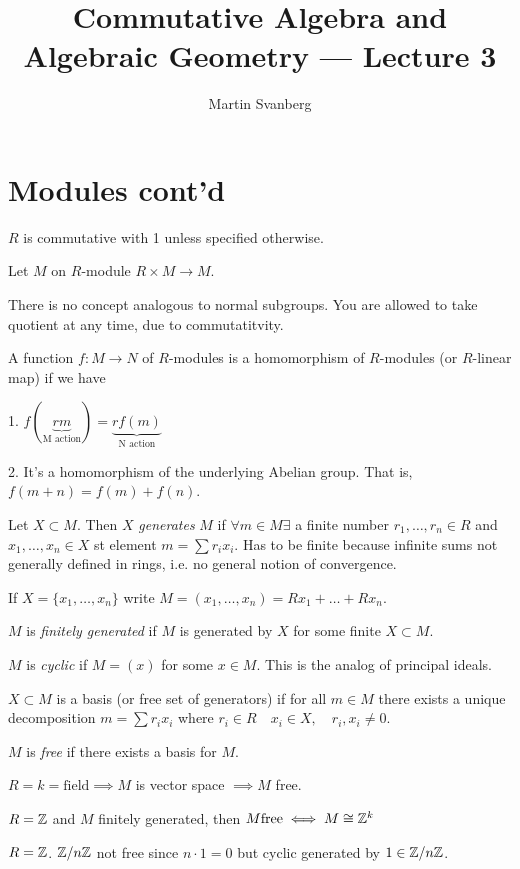 \documentclass{./template}
\title{Commutative Algebra and Algebraic Geometry --- Lecture 3}
\author{Martin Svanberg}
\begin{document}
  \maketitle

  \section{Modules cont'd}

  $R$ is commutative with 1 unless specified otherwise.

  {\rec Let $M$ on $R$-module $R\times M\to M$. 
  }

  There is no concept analogous to normal subgroups. You are allowed to take quotient at any time, due to commutatitvity.

  { A function $f:M\to N$ of $R$-modules is a homomorphism of $R$-modules (or $R$-linear map)  if we have
  
  1. $f(\underbrace{rm}_\text{M action})=\underbrace{rf(m)}_\text{N action}$
  
  2. It's a homomorphism of the underlying Abelian group. That is, $f(m+n)=f(m)+f(n)$.
  
  }

  Let $X\subset M$. Then $X$ {\em generates} $M$ if $\forall m\in M \exists$ a finite number $r_1,\ldots,r_n\in R$ and $x_1,\ldots,x_n\in X$ st element $m=\sum r_ix_i$. Has to be finite because infinite sums not generally defined in rings, i.e. no general notion of convergence.
  
  If $X=\{x_1,\ldots,x_n\}$ write $M=(x_1,\ldots,x_n)=Rx_1+\ldots+Rx_n$.

  $M$ is {\em finitely generated} if $M$ is generated by $X$ for some finite $X\subset M$.
  
  $M$ is {\em cyclic} if $M=(x)$ for some $x\in M$. This is the analog of principal ideals. 

  \hrulefill

  $X\subset M$ is a basis (or free set of generators) if for all $m\in M$ there exists a unique decomposition $m=\sum r_ix_i$ where $r_i\in R\quad x_i\in X, \quad r_i,x_i\neq 0$.

  $M$ is {\em free} if there exists a basis for $M$.

  {\ex $R=k=\text{field}\implies M$ is vector space $\implies M$ free.}

  {\ex $R=\mathbb Z$ and $M$ finitely generated, then $M \text{free} \iff M \cong \mathbb Z^k$}

  {\ex $R=\mathbb Z$. $\mathbb Z/n\mathbb Z$ not free since $n\cdot 1 = 0$ but cyclic generated by $1\in \mathbb Z/n\mathbb Z$.}
\end{document}
